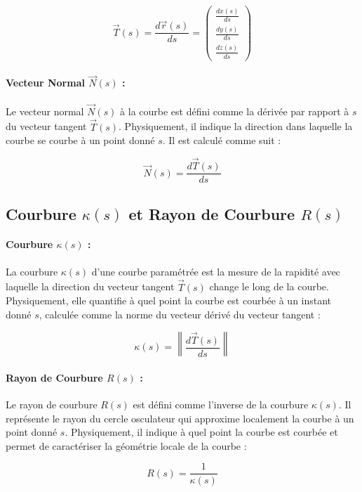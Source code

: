 \documentclass[a4paper,12pt]{article}
\begin{document}
\[
\vec{T}(s) = \frac{d\vec{r}(s)}{ds} = \begin{pmatrix}
\frac{dx(s)}{ds} \\
\frac{dy(s)}{ds} \\
\frac{dz(s)}{ds}
\end{pmatrix}
\]


\paragraph{Vecteur Normal \(\vec{N}(s)\) :}

Le vecteur normal \(\vec{N}(s)\) à la courbe est défini comme la dérivée par rapport à \(s\) du vecteur tangent \(\vec{T}(s)\). Physiquement, il indique la direction dans laquelle la courbe se courbe à un point donné \(s\). Il est calculé comme suit :

\[
\vec{N}(s) = \frac{d\vec{T}(s)}{ds}
\]

\subsection{Courbure \(\kappa(s)\) et Rayon de Courbure \(R(s)\)}

\paragraph{Courbure \(\kappa(s)\) :}

La courbure \(\kappa(s)\) d'une courbe paramétrée est la mesure de la rapidité avec laquelle la direction du vecteur tangent \(\vec{T}(s)\) change le long de la courbe. Physiquement, elle quantifie à quel point la courbe est courbée à un instant donné \(s\), calculée comme la norme du vecteur dérivé du vecteur tangent :

\[
\kappa(s) = \left\| \frac{d\vec{T}(s)}{ds} \right\|
\]

\paragraph{Rayon de Courbure \(R(s)\) :}

Le rayon de courbure \(R(s)\) est défini comme l'inverse de la courbure \(\kappa(s)\). Il représente le rayon du cercle osculateur qui approxime localement la courbe à un point donné \(s\). Physiquement, il indique à quel point la courbe est courbée et permet de caractériser la géométrie locale de la courbe :

\[
R(s) = \frac{1}{\kappa(s)}
\]

\newpage
\end{document}
